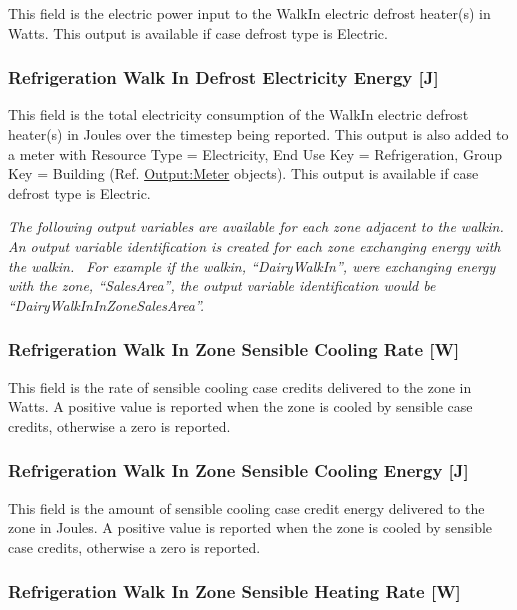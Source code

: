This field is the electric power input to the WalkIn electric defrost heater(s) in Watts. This output is available if case defrost type is Electric.

\subsubsection{Refrigeration Walk In Defrost Electricity Energy {[}J{]}}\label{refrigeration-walk-in-defrost-electric-energy-j}

This field is the total electricity consumption of the WalkIn electric defrost heater(s) in Joules over the timestep being reported. This output is also added to a meter with Resource Type = Electricity, End Use Key = Refrigeration, Group Key = Building (Ref. \hyperref[outputmeter-and-outputmetermeterfileonly]{Output:Meter} objects). This output is available if case defrost type is Electric.

\emph{The following output variables are available for each zone adjacent to the walkin. An output variable identification is created for each zone exchanging energy with the walkin.~ For example if the walkin, ``DairyWalkIn'', were exchanging energy with the zone, ``SalesArea'', the output variable identification would be ``DairyWalkInInZoneSalesArea''.}

\subsubsection{Refrigeration Walk In Zone Sensible Cooling Rate {[}W{]}}\label{refrigeration-walk-in-zone-sensible-cooling-rate-w}

This field is the rate of sensible cooling case credits delivered to the zone in Watts. A positive value is reported when the zone is cooled by sensible case credits, otherwise a zero is reported.

\subsubsection{Refrigeration Walk In Zone Sensible Cooling Energy {[}J{]}}\label{refrigeration-walk-in-zone-sensible-cooling-energy-j}

This field is the amount of sensible cooling case credit energy delivered to the zone in Joules. A positive value is reported when the zone is cooled by sensible case credits, otherwise a zero is reported.

\subsubsection{Refrigeration Walk In Zone Sensible Heating Rate {[}W{]}}\label{refrigeration-walk-in-zone-sensible-heating-rate-w}

